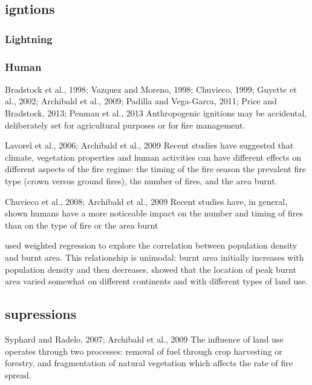 \subsection{igntions}

\subsubsection{Lightning}

\subsubsection{Human}
Bradstock et al., 1998; Vazquez and
Moreno, 1998; Chuvieco, 1999; Guyette et al., 2002; Archibald et al., 2009; Padilla and
Vega-Garca, 2011; Price and Bradstock, 2013; Penman et al., 2013
Anthropogenic ignitions may be accidental, deliberately set
for agricultural purposes or for fire management.

Lavorel et al., 2006; Archibald et al., 2009
Recent studies have suggested that climate, vegetation properties and human activities can have different effects on different aspects of the fire regime:      the timing of the fire season
    the prevalent fire type (crown versus ground fires),
    the number of fires,
    and the area burnt.

Chuvieco et al., 2008; Archibald et al., 2009
Recent studies have, in general, shown humans have a more noticeable impact on the number and timing of fires than on the type of fire or the area burnt

\citet{bistinas2013relationships}
used weighted regression to explore the correlation between population density and burnt area. This relationship is unimodal: burnt area initially increases with population density and then decreases. \citet{bistinas2013relationships} showed that the location of peak burnt area varied somewhat on different continents and with different types of land use.

\subsection{supressions}
Syphard  and  Radelo,  2007;  Archibald  et  al.,  2009
The influence of land use operates through two processes:  removal of fuel through crop harvesting or forestry, and fragmentation of natural vegetation which affects the rate of fire spread.

